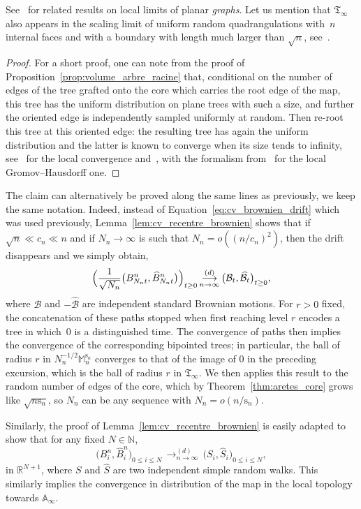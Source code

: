 \documentclass[JEP,XML,SOM,Unicode,NoFloatCountersInSection,NoEqCountersInSection]{cedram}
\theoremstyle{plain}
\theoremstyle{definition}
\theoremstyle{remark}
\newcommand{\N}{\mathbb{N}}
\newcommand{\R}{\mathbb{R}}
\newcommand{\Tree}{\mathfrak{T}}
\newcommand{\Mapb}{\mathbb{M}}
\newcommand{\spar}{\mathrm{s}}
\newcommand{\cvloi}[1][n]{\,\mathop{\longrightarrow}^{(d)}_{#1 \to \infty}\,}
\begin{document}
See~\cite{KM21a} for related results on local limits of planar \emph{graphs}.
Let us mention that $\Tree_\infty$ also appears in the scaling limit of uniform random quadrangulations with~$n$ internal faces and with a boundary with length much larger than $\sqrt{n}$, see~\cite[Th.\,3.4]{BMR19}.

\begin{proof}
For a short proof, one can note from the proof of Proposition~\ref{prop:volume_arbre_racine} that, conditional on the number of edges of the tree grafted onto the core which carries the root edge of the map, this tree has the uniform distribution on plane trees with such a size, and further the oriented edge is independently sampled uniformly at random. Then re-root this tree at this oriented edge: the resulting tree has again the uniform distribution and the latter is known to converge when its size tends to infinity, see~\cite[Th.\,7.1]{Jan12} for the local convergence and~\cite[\S 2.5]{Ald91c}, with the formalism from~\cite{DLG05} for the local Gromov--Hausdorff one.
\end{proof}

The claim can alternatively be proved along the same lines as previously, we keep the same notation.
Indeed, instead of Equation~\eqref{eq:cv_brownien_drift} which was used previously, Lemma~\ref{lem:cv_recentre_brownien} shows that if $\sqrt{n} \ll c_n \ll n$ and if $N_{n} \to \infty$ is such that $N_{n} = o((n/c_{n})^2)$, then the drift disappears and we simply obtain,
\[
\Bigl(\frac{1}{\sqrt{N_{n}}} \bigl(B^{n}_{N_{n}t}, \widehat{B}^{n}_{N_{n}t}\bigr)\Bigl)_{t \ge 0}
\cvloi \bigl(\mathcal{B}_{t}, \widehat{\mathcal{B}}_{t}\bigr)_{t \ge 0},
\]
where $\mathcal{B}$ and $-\widehat{\mathcal{B}}$ are independent standard Brownian motions.
For $r>0$ fixed, the concatenation of these paths stopped when first reaching level $r$ encodes a tree in which~$0$ is a distinguished time.
The convergence of paths then implies the convergence of the corresponding bipointed trees; in particular, the ball of radius $r$ in $N_n^{-1/2} \Mapb_n^{\spar_n}$ converges to that of the image of $0$ in the preceding excursion, which is the ball of radius $r$ in $\Tree_\infty$.
We then applies this result to the random number of edges of the core, which by Theorem~\ref{thm:aretes_core} grows like $\sqrt{n\spar_n}$, so $N_n$ can be any sequence with $N_n = o(n/\spar_n)$.

Similarly, the proof of Lemma~\ref{lem:cv_recentre_brownien} is easily adapted to show that
for any fixed $N \in \N$,
\[
\big(B^{n}_{i}, \widehat{B}^{n}_{i}\big)_{0 \le i \le N} \cvloi \big(S_{i}, \widehat{S}_{i}\big)_{0 \le i \le N},
\]
in $\R^{N+1}$, where $S$ and $\widehat{S}$ are two independent simple random walks.
This similarly implies the convergence in distribution of the map in the local topology towards $\mathbb{A}_\infty$.
\end{document}
